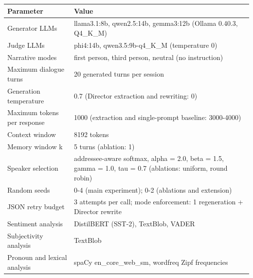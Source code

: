 \begin{tabular}{ll}
\toprule
Parameter & Value \\
\midrule
Generator LLMs & llama3.1:8b, qwen2.5:14b, gemma3:12b (Ollama 0.40.3, Q4_K_M) \\
Judge LLMs & phi4:14b, qwen3.5:9b-q4_K_M (temperature 0) \\
Narrative modes & first person, third person, neutral (no instruction) \\
Maximum dialogue turns & 20 generated turns per session \\
Generation temperature & 0.7 (Director extraction and rewriting: 0) \\
Maximum tokens per response & 1000 (extraction and single-prompt baseline: 3000-4000) \\
Context window & 8192 tokens \\
Memory window k & 5 turns (ablation: 1) \\
Speaker selection & addressee-aware softmax, alpha = 2.0, beta = 1.5, gamma = 1.0, tau = 0.7 (ablations: uniform, round robin) \\
Random seeds & 0-4 (main experiment); 0-2 (ablations and extension) \\
JSON retry budget & 3 attempts per call; mode enforcement: 1 regeneration + Director rewrite \\
Sentiment analysis & DistilBERT (SST-2), TextBlob, VADER \\
Subjectivity analysis & TextBlob \\
Pronoun and lexical analysis & spaCy en_core_web_sm, wordfreq Zipf frequencies \\
\bottomrule
\end{tabular}

